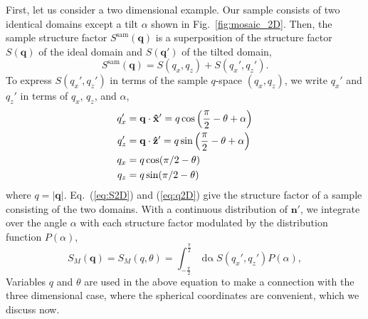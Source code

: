 First, let us consider a two dimensional example. 
Our sample consists of two identical domains except a tilt $\alpha$
shown in Fig.~\ref{fig:mosaic_2D}.
Then, the sample structure factor $S^\textrm{sam}(\mathbf{q})$ is 
a superposition of the structure factor $S(\mathbf{q})$ of the ideal
domain and $S(\mathbf{q'})$ of the tilted domain,
\begin{equation}
  S^\textrm{sam}(\mathbf{q}) = S(q_x,q_z) + S(q_x',q_z').
  \label{eq:S2D}
\end{equation}
To express $S(q_x',q_z')$ in terms of the sample $q$-space $(q_x,q_z)$, 
we write $q_x'$ and $q_z'$ in terms of $q_x$, $q_z$, and $\alpha$,
\begin{align}
  q_x' &= \mathbf{q}\cdot\mathbf{\hat{x}}' = q\cos\left(\frac{\pi}{2}-\theta+\alpha\right) \nonumber\\
  q_z' &= \mathbf{q}\cdot\mathbf{\hat{z}}' = q\sin\left(\frac{\pi}{2}-\theta+\alpha\right) \nonumber\\
  q_x &= q\cos(\pi/2-\theta) \nonumber\\
  q_z &= q\sin(\pi/2-\theta)
  \label{eq:q2D}
\end{align}
where $q=|\mathbf{q}|$. Eq.~(\ref{eq:S2D}) and (\ref{eq:q2D}) give
the structure factor of a sample consisting of the two domains. With a 
continuous distribution of $\mathbf{n'}$, we integrate over the angle $\alpha$
with each structure factor modulated by the distribution function $P(\alpha)$,
\begin{equation}
  S_M(\mathbf{q})=S_M(q,\theta)=\int_{-\frac{\pi}{2}}^{\frac{\pi}{2}}
  \mathop{d\alpha} S(q_x',q_z')P(\alpha),
  \label{eq:SM2D}
\end{equation}
Variables $q$ and $\theta$ are used in the above equation to make a connection with the
three dimensional case, where the spherical coordinates are convenient, which
we discuss now.

